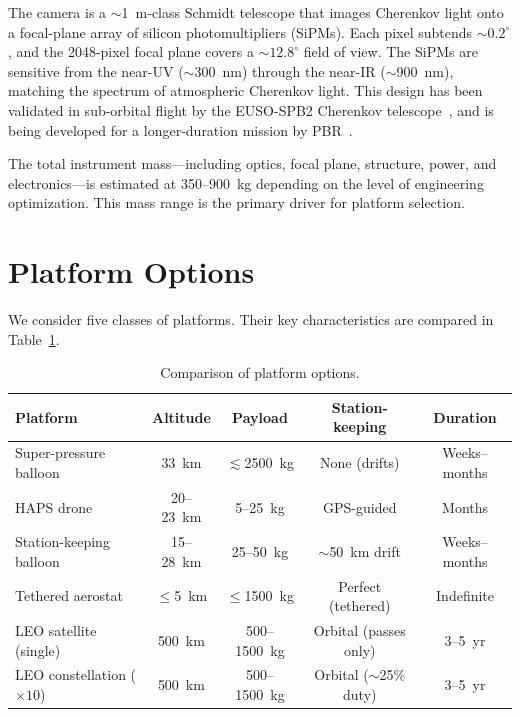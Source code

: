 \documentclass[11pt]{article}
\begin{document}
The camera is a $\sim$1~m-class Schmidt telescope that images
Cherenkov light onto a focal-plane array of silicon photomultipliers
(SiPMs).  Each pixel subtends $\sim 0.2^\circ$, and the 2048-pixel
focal plane covers a $\sim 12.8^\circ$ field of view.  The SiPMs
are sensitive from the near-UV ($\sim$300~nm) through the near-IR
($\sim$900~nm), matching the spectrum of atmospheric Cherenkov light.
This design has been validated in sub-orbital flight by the
EUSO-SPB2 Cherenkov telescope~\cite{EUSO-SPB2-CT}, and is being
developed for a longer-duration mission by PBR~\cite{PBR-camera,PBR-mission}.

The total instrument mass---including optics, focal plane, structure,
power, and electronics---is estimated at 350--900~kg depending on the
level of engineering optimization.  This mass range is the primary driver
for platform selection.


\section{Platform Options}
\label{sec:platforms}

We consider five classes of platforms.  Their key characteristics
are compared in Table~\ref{tab:platforms}.

\begin{table}[h]
\centering
\small
\begin{tabular}{lcccc}
\toprule
\textbf{Platform} & \textbf{Altitude} & \textbf{Payload} &
\textbf{Station-keeping} & \textbf{Duration} \\
\midrule
Super-pressure balloon   & 33~km   & $\lesssim$2500~kg & None (drifts) & Weeks--months \\
HAPS drone               & 20--23~km & 5--25~kg & GPS-guided & Months \\
Station-keeping balloon  & 15--28~km & 25--50~kg & $\sim$50~km drift & Weeks--months \\
Tethered aerostat        & $\leq$5~km & $\leq$1500~kg & Perfect (tethered) & Indefinite \\
LEO satellite (single)   & 500~km  & 500--1500~kg & Orbital (passes only) & 3--5~yr \\
LEO constellation ($\times 10$) & 500~km & 500--1500~kg & Orbital ($\sim$25\% duty) & 3--5~yr \\
\bottomrule
\end{tabular}
\caption{Comparison of platform options.}
\label{tab:platforms}
\end{table}
\end{document}
